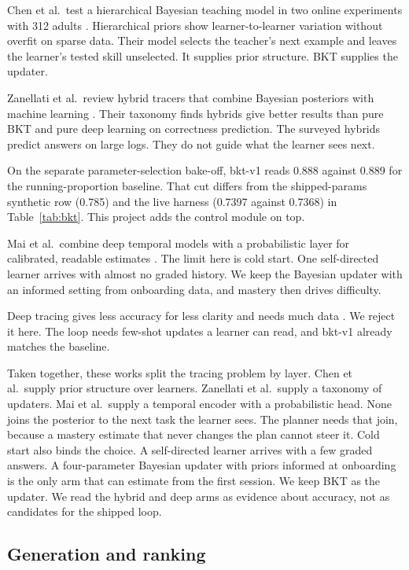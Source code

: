 \documentclass[sn-mathphys,Numbered]{sn-jnl}%
\theoremstyle{thmstyleone}%
\theoremstyle{thmstyletwo}%
\theoremstyle{thmstylethree}%
\begin{document}
Chen et al.\ test a hierarchical Bayesian teaching model in two online experiments with 312 adults \cite{chen2024}. Hierarchical priors show learner-to-learner variation without overfit on sparse data. Their model selects the teacher's next example and leaves the learner's tested skill unselected. It supplies prior structure. BKT supplies the updater.

Zanellati et al.\ review hybrid tracers that combine Bayesian posteriors with machine learning \cite{zanellati2024}. Their taxonomy finds hybrids give better results than pure BKT and pure deep learning on correctness prediction. The surveyed hybrids predict answers on large logs. They do not guide what the learner sees next.

On the separate parameter-selection bake-off, bkt-v1 reads 0.888 against 0.889 for the running-proportion baseline. That cut differs from the shipped-params synthetic row (0.785) and the live harness (0.7397 against 0.7368) in Table~\ref{tab:bkt}. This project adds the control module on top.

Mai et al.\ combine deep temporal models with a probabilistic layer for calibrated, readable estimates \cite{mai2025}. The limit here is cold start. One self-directed learner arrives with almost no graded history. We keep the Bayesian updater with an informed setting from onboarding data, and mastery then drives difficulty.

Deep tracing gives less accuracy for less clarity and needs much data \cite{piech2015}. We reject it here. The loop needs few-shot updates a learner can read, and bkt-v1 already matches the baseline.

Taken together, these works split the tracing problem by layer. Chen et al.\ supply prior structure over learners. Zanellati et al.\ supply a taxonomy of updaters. Mai et al.\ supply a temporal encoder with a probabilistic head. None joins the posterior to the next task the learner sees. The planner needs that join, because a mastery estimate that never changes the plan cannot steer it. Cold start also binds the choice. A self-directed learner arrives with a few graded answers. A four-parameter Bayesian updater with priors informed at onboarding is the only arm that can estimate from the first session. We keep BKT as the updater. We read the hybrid and deep arms as evidence about accuracy, not as candidates for the shipped loop.

\subsection{Generation and ranking}\label{subsec22}
\end{document}

